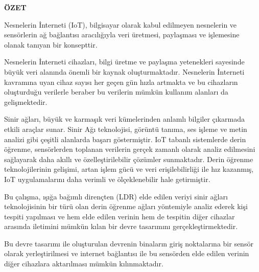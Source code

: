 {\centering \textbf{ÖZET}\par}

{
\setlength{\parindent}{0pt}
Nesnelerin İnterneti (IoT), bilgisayar olarak kabul edilmeyen nesnelerin ve sensörlerin ağ bağlantısı aracılığıyla veri üretmesi, paylaşması ve işlemesine olanak tanıyan bir konsepttir.  

Nesnelerin İnterneti cihazları, bilgi üretme ve paylaşma yetenekleri sayesinde büyük veri alanında önemli bir kaynak oluşturmaktadır. Nesnelerin İnterneti kavramına uyan cihaz sayısı her geçen gün hızla artmakta ve bu cihazların oluşturduğu verilerle beraber bu verilerin mümkün kullanım alanları da gelişmektedir. 


Sinir ağları, büyük ve karmaşık veri kümelerinden anlamlı bilgiler çıkarmada etkili araçlar sunar. Sinir Ağı teknolojisi, görüntü tanıma, ses işleme ve metin analizi gibi çeşitli alanlarda başarı göstermiştir. IoT tabanlı sistemlerde derin öğrenme, sensörlerden toplanan verilerin gerçek zamanlı olarak analiz edilmesini sağlayarak daha akıllı ve özelleştirilebilir çözümler sunmaktadır. Derin öğrenme teknolojilerinin gelişimi, artan işlem gücü ve veri erişilebilirliği ile hız kazanmış, IoT uygulamalarını daha verimli ve ölçeklenebilir hale getirmiştir. 

Bu çalışma, ışığa bağımlı dirençten (LDR) elde edilen veriyi sinir ağları teknolojisinin bir türü olan derin öğrenme ağları yöntemiyle analiz ederek kişi tespiti yapılması ve hem elde edilen verinin hem de tespitin diğer cihazlar arasında iletimini mümkün kılan bir devre tasarımını gerçekleştirmektedir.  

Bu devre tasarımı ile oluşturulan devrenin binaların giriş noktalarına bir sensör olarak yerleştirilmesi ve internet bağlantısı ile bu sensörden elde edilen verinin diğer cihazlara aktarılması mümkün kılınmaktadır.
}

{}